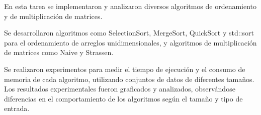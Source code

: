 En esta tarea se implementaron y analizaron diversos algoritmos de ordenamiento y de multiplicación de matrices.

Se desarrollaron algoritmos como SelectionSort, MergeSort, QuickSort y std::sort para el ordenamiento de arreglos unidimensionales, y algoritmos de multiplicación de matrices como Naive y Strassen.

Se realizaron experimentos para medir el tiempo de ejecución y el consumo de memoria de cada algoritmo, utilizando conjuntos de datos de diferentes tamaños. Los resultados experimentales fueron graficados y analizados, observándose diferencias en el comportamiento de los algoritmos según el tamaño y tipo de entrada.
